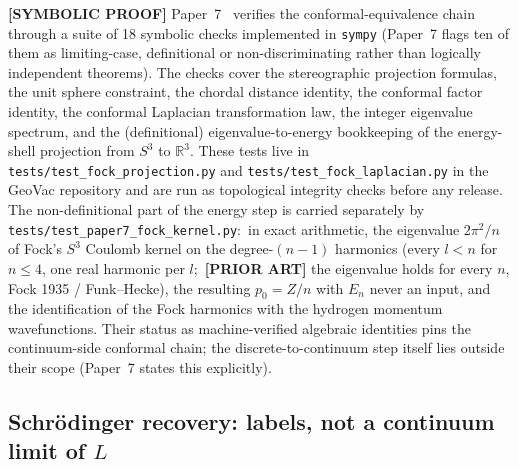 \documentclass[aps,pra,twocolumn,superscriptaddress,longbibliography]{revtex4-2}
\newcommand{\gvc}[2]{#2}
\begin{document}
\textbf{[SYMBOLIC PROOF]} \gvc{paper7-symbolic-checks}{Paper~7~\cite{loutey_paper7} verifies the conformal-equivalence chain
through a suite of 18 symbolic checks implemented in \texttt{sympy}
(Paper~7 flags ten of them as limiting-case, definitional or
non-discriminating rather than logically independent theorems)}.
The checks cover the stereographic projection formulas, the unit
sphere constraint, the chordal distance identity, the conformal factor
identity, the conformal Laplacian transformation law, the integer
eigenvalue spectrum, and the (definitional) eigenvalue-to-energy
bookkeeping of the energy-shell projection from $S^3$ to
$\mathbb{R}^3$.  These tests live in
\texttt{tests/test\_fock\_projection.py} and
\texttt{tests/test\_fock\_laplacian.py} in the GeoVac repository and
are run as topological integrity checks before any release.  The
non-definitional part of the energy step is carried separately by
\texttt{tests/test\_paper7\_fock\_kernel.py}:\ in exact arithmetic, the
eigenvalue $2\pi^2/n$ of Fock's $S^3$ Coulomb kernel on the
degree-$(n-1)$ harmonics (every $l < n$ for $n \le 4$, one real
harmonic per $l$;\ \textbf{[PRIOR ART]} the eigenvalue holds for every
$n$, Fock 1935 / Funk--Hecke), the resulting $p_0 = Z/n$ with $E_n$
never an input, and the identification of the Fock harmonics with the
hydrogen momentum wavefunctions.  Their
status as machine-verified algebraic identities pins the
continuum-side conformal chain; the discrete-to-continuum step itself
lies outside their scope (Paper~7 states this explicitly).

\subsection*{Schr\"odinger recovery: labels, not a continuum limit of $L$}
\end{document}
